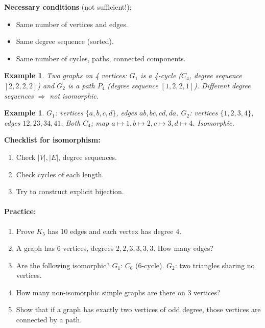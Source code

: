 \documentclass[11pt]{article}
\newtheorem{example}[definition]{Example}
\newenvironment{practice}{\paragraph*{\textbf{Practice:}}}{}
\begin{document}
\textbf{Necessary conditions} (not sufficient!):
\begin{itemize}[nosep]
  \item Same number of vertices and edges.
  \item Same degree sequence (sorted).
  \item Same number of cycles, paths, connected components.
\end{itemize}

\begin{example}
Two graphs on 4 vertices: $G_1$ is a 4-cycle ($C_4$, degree sequence $[2,2,2,2]$) and $G_2$ is a path $P_4$ (degree sequence $[1,2,2,1]$). Different degree sequences $\Rightarrow$ not isomorphic.
\end{example}

\begin{example}
$G_1$: vertices $\{a,b,c,d\}$, edges $ab,bc,cd,da$. $G_2$: vertices $\{1,2,3,4\}$, edges $12,23,34,41$. Both $C_4$; map $a\mapsto1,b\mapsto2,c\mapsto3,d\mapsto4$. Isomorphic.
\end{example}

\textbf{Checklist for isomorphism:}
\begin{enumerate}[nosep,label=\arabic*.]
  \item Check $|V|,|E|$, degree sequences.
  \item Check cycles of each length.
  \item Try to construct explicit bijection.
\end{enumerate}

\begin{practice}
\begin{enumerate}[nosep,label=\arabic*.]
  \item Prove $K_5$ has 10 edges and each vertex has degree 4.
  \item A graph has 6 vertices, degrees $2,2,3,3,3,3$. How many edges?
  \item Are the following isomorphic? $G_1$: $C_6$ (6-cycle). $G_2$: two triangles sharing no vertices.
  \item How many non-isomorphic simple graphs are there on 3 vertices?
  \item Show that if a graph has exactly two vertices of odd degree, those vertices are connected by a path.
\end{enumerate}
\end{practice}

\newpage
\end{document}
